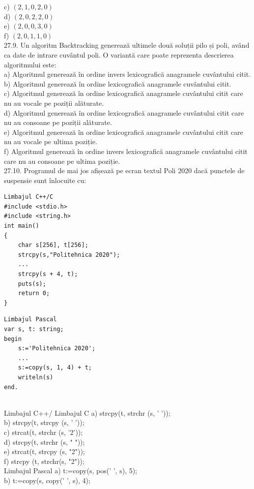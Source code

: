 c) $(2,1,0,2,0)$
\\
d) $(2,0,2,2,0)$
\\
e) $(2,0,0,3,0)$
\\
f) $(2,0,1,1,0)$
\\
27.9. Un algoritm Backtracking generează ultimele două soluții pilo și poli, având ca date de intrare cuvântul poli. O variantă care poate reprezenta descrierea algoritmului este:
\\
a) Algoritmul generează în ordine invers lexicografică anagramele cuvântului citit.
\\
b) Algoritmul generează în ordine lexicografică anagramele cuvântului citit.
\\
c) Algoritmul generează în ordine lexicografică anagramele cuvântului citit care nu au vocale pe poziții alăturate.
\\
d) Algoritmul generează în ordine lexicografică anagramele cuvântului citit care nu au consoane pe poziții alăturate.
\\
e) Algoritmul generează în ordine lexicografică anagramele cuvântului citit care nu au vocale pe ultima poziție.
\\
f) Algoritmul generează în ordine invers lexicografică anagramele cuvântului citit care nu au consoane pe ultima poziție.
\\
27.10. Programul de mai jos afișează pe ecran textul Poli 2020 dacă punctele de suspensie sunt înlocuite cu:
\begin{verbatim}
Limbajul C++/C
#include <stdio.h>
#include <string.h>
int main()
{
    char s[256], t[256];
    strcpy(s,"Politehnica 2020");
    ...
    strcpy(s + 4, t);
    puts(s);
    return 0;
}
\end{verbatim}
\begin{verbatim}
Limbajul Pascal
var s, t: string;
begin
    s:='Politehnica 2020';
    ...
    s:=copy(s, 1, 4) + t;
    writeln(s)
end.
\end{verbatim}
\\
Limbajul C++/ Limbajul C
a) strcpy(t, strchr (s, ' '));
\\
b) strcpy(t, strcpy (s, ' '));
\\
c) strcat(t, strchr (s, '2'));
\\
d) strcpy(t, strchr (s, " "));
\\
e) strcat(t, strcpy (s, "2"));
\\
f) strcpy (t, strchr(s, "2"));
\\
Limbajul Pascal
a) t:=copy(s, pos(' ', s), 5);
\\
b) t:=copy(s, copy(' ', s), 4);
